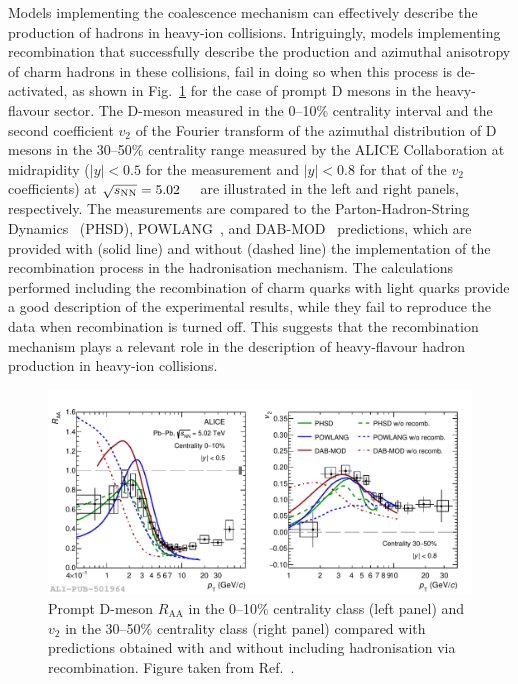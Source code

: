 Models implementing the coalescence mechanism can effectively describe the production of hadrons in heavy-ion collisions. Intriguingly, models implementing recombination that successfully describe the production and azimuthal anisotropy of charm hadrons in these collisions, fail in doing so when this process is de-activated, as shown in Fig.~\ref{fig:D_recombination} for the case of prompt D mesons in the heavy-flavour sector. The D-meson \raa measured in the 0--10\% centrality interval and the second coefficient $v_2$ of the Fourier transform of the azimuthal distribution of D mesons in the 30--50\% centrality range measured by the ALICE Collaboration at midrapidity ($\lvert y\lvert<0.5$ for the \raa measurement and $\lvert y\lvert<0.8$ for that of the $v_2$ coefficients) at $\sqrt{s_\mathrm{NN}}=5.02$~\tev~\cite{ALICE:2021rxa} are illustrated in the left and right panels, respectively. The measurements are compared to the Parton-Hadron-String Dynamics~\cite{Cassing:2008sv} (PHSD), POWLANG~\cite{Beraudo:2014boa}, and DAB-MOD~\cite{Katz:2019fkc} predictions, which are provided with (solid line) and without (dashed line) the implementation of the recombination process in the hadronisation mechanism. The calculations performed including the recombination of charm quarks with light quarks provide a good description of the experimental results, while they fail to reproduce the data when recombination is turned off. This suggests that the recombination mechanism plays a relevant role in the description of heavy-flavour hadron production in heavy-ion collisions.
\begin{figure}[htb]
  \centering
  \includegraphics[width=\linewidth]{Figures/Chapter 2/D_Raa010_V23050_FragCoal_3models_1.pdf}
  \caption{Prompt D-meson $R_\mathrm{AA}$ in the 0--10\% centrality class (left panel) and $v_2$ in the 30--50\% centrality class (right panel) compared with predictions obtained with and without including hadronisation via recombination. Figure taken from Ref.~\cite{ALICE:2021rxa}.}
  \label{fig:D_recombination}
\end{figure}

